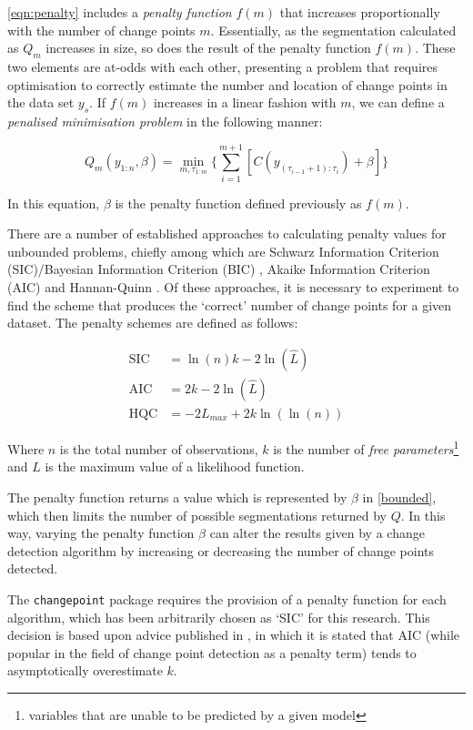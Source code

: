 \documentclass{uvamscse}	%
\begin{document}
\autoref{eqn:penalty} includes a \emph{penalty function} $f(m)$ that increases proportionally with the number of change points $m$. Essentially, as the segmentation calculated as $Q_m$ increases in size, so does the result of the penalty function $f(m)$. These two elements are at-odds with each other, presenting a problem that requires optimisation to correctly estimate the number and location of change points in the data set $y_s$. If $f(m)$ increases in a linear fashion with $m$, we can define a \emph{penalised minimisation problem} in the following manner:

\begin{equation}
\label{bounded}
    Q_m(y_{1:n}, \beta) = \min_{m,\tau_{1:m}} \Bigg\{ \sum^{m+1}_{i=1}[C(y_{(\tau_{i - 1} + 1):\tau_i}) + \beta] \Bigg\}
\end{equation}

In this equation, $\beta$ is the penalty function defined previously as $f(m)$.

There are a number of established approaches to calculating penalty values for unbounded problems, chiefly among which are Schwarz Information Criterion (SIC)/Bayesian Information Criterion (BIC) \cite{Schwarz1978}, Akaike Information Criterion (AIC) \cite{Akaike1974} and Hannan-Quinn \cite{Journal2009}. Of these approaches, it is necessary to experiment to find the scheme that produces the `correct' number of change points for a given dataset. The penalty schemes are defined as follows:

\begin{align}
    \text{SIC} &= \ln(n) k - 2 \ln(\hat{L})\\
    \text{AIC} &= 2k - 2 \ln(\hat{L})\\
    \text{HQC} &= -2L_{max} + 2k \ln(\ln(n))
\end{align}

Where $n$ is the total number of observations, $k$ is the number of \emph{free parameters}\footnote{variables that are unable to be predicted by a given model} and $\hat{L}$ is the maximum value of a likelihood function.

The penalty function returns a value which is represented by $\beta$ in \autoref{bounded}, which then limits the number of possible segmentations returned by $Q$. In this way, varying the penalty function $\beta$ can alter the results given by a change detection algorithm by increasing or decreasing the number of change points detected.

The \texttt{changepoint} package requires the provision of a penalty function for each algorithm, which has been arbitrarily chosen as `SIC' for this research. This decision is based upon advice published in \cite{Eckley2011}, in which it is stated that AIC (while popular in the field of change point detection as a penalty term) tends to asymptotically overestimate $k$.
\end{document}
